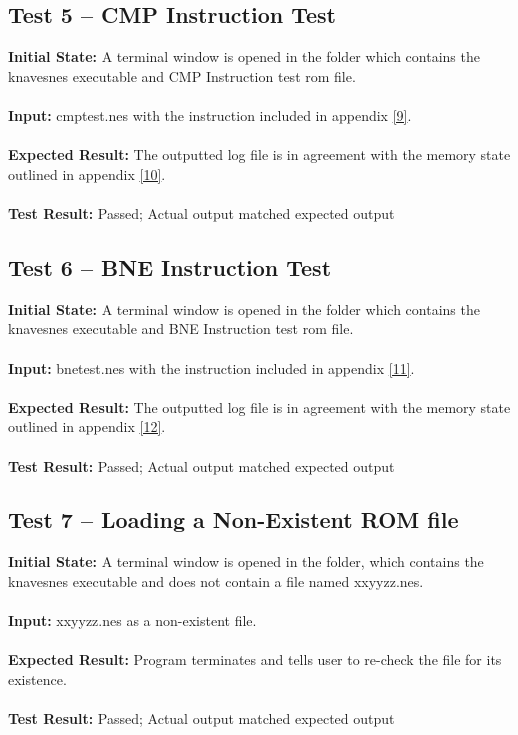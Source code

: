 \documentclass[12pt]{article}
\begin{document}
	\subsection{Test 5 – CMP Instruction Test}
		\textbf{Initial State: } A terminal window is opened in the folder which contains the knavesnes executable and CMP Instruction test rom file.\\\\
		\textbf{Input: } cmptest.nes with the instruction included in appendix \hyperlink{appendix}{[9]}.\\\\
		\textbf{Expected Result: } The outputted log file is in agreement with the memory state outlined in appendix \hyperlink{appendix}{[10]}.\\\\
		\textbf{Test Result: } Passed; Actual output matched expected output

	\subsection{Test 6 – BNE Instruction Test}
		\textbf{Initial State: } A terminal window is opened in the folder which contains the knavesnes executable and BNE Instruction test rom file.\\\\
		\textbf{Input: } bnetest.nes with the instruction included in appendix \hyperlink{appendix}{[11]}.\\\\
		\textbf{Expected Result: } The outputted log file is in agreement with the memory state outlined in appendix \hyperlink{appendix}{[12]}.\\\\
		\textbf{Test Result: } Passed; Actual output matched expected output

	\subsection{Test 7 – Loading a Non-Existent ROM file}
		\textbf{Initial State: } A terminal window is opened in the folder, which contains the knavesnes executable and does not contain a file named xxyyzz.nes.\\\\
		\textbf{Input: } xxyyzz.nes as a non-existent file.\\\\
		\textbf{Expected Result: } Program terminates and tells user to re-check the file for its existence.\\\\
		\textbf{Test Result: } Passed; Actual output matched expected output
\end{document}
